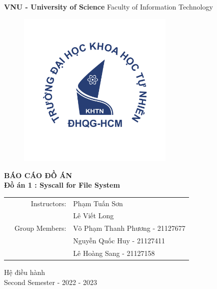 \documentclass[12pt,a4paper]{article}
\begin{document}
\begin{center}
    \center
    \LARGE{\textbf{VNU - University of Science}}
    \linebreak
    \large{Faculty of Information Technology}
    \bigskip
    \begin{figure}[!h]
        \centering
        \includegraphics[width=75mm]{logo KHTN_REMAKE 1.png}
    \end{figure}

    \large{\textbf{BÁO CÁO ĐỒ ÁN}}\\
    \large{\textbf{Đồ án 1 : Syscall for File System}}\\

\end{center}

\bigskip

\begin{table}[h]
    \begin{tabular}{rrl}
        \hspace{3 cm} & Instructors: & Phạm Tuấn Sơn                \\
                      &              & Lê Viết Long         \\    
                      & Group Members:   & Võ Phạm Thanh Phương - 21127677 \\
                      &       & Nguyễn Quốc Huy - 21127411     \\
                      &       & Lê Hoàng Sang - 21127158    \\
    \end{tabular}
\end{table}

\begin{center}
    {\footnotesize Hệ điều hành}\\
    {\footnotesize Second Semester -  2022 - 2023}
\end{center}
\end{document}
